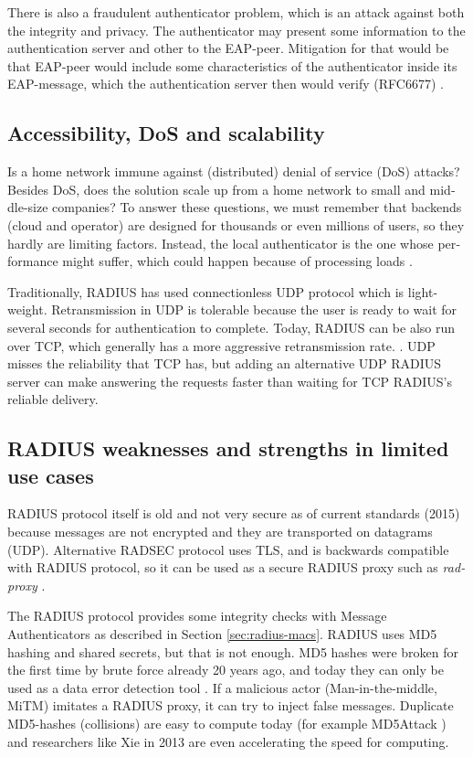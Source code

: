 \documentclass[12pt,a4paper,english]{tutthesis}
\begin{document}
\begin{otherlanguage}{english}
There is also a fraudulent authenticator problem, which is an attack
against both the integrity and privacy.  The authenticator may present
some information to the authentication server and other to the
EAP-peer. Mitigation for that would be that EAP-peer would include some
characteristics of the authenticator inside its EAP-message, which
the authentication server then would verify (RFC6677) \cite{rfc6677}.

\subsection{Accessibility, DoS and scalability}
\label{sec-6-1-3}

Is a home network immune against (distributed) denial of service (DoS)
attacks? Besides DoS, does the solution scale up from a home network to
small and middle-size companies?
To answer these questions, we must remember that backends (cloud and operator) are
designed for thousands or even millions of users, so 
they hardly are limiting factors. Instead, the local
authenticator is the one whose performance might suffer, which
could happen because of processing loads \cite{2009-lin-simefficiency}.


Traditionally, RADIUS has used connection\-less UDP protocol which  is
light-weight. Retransmission in UDP is tolerable because the user is
ready to wait for several seconds for authentication to complete.  
Today, RADIUS can be also run over TCP, which generally has a more
aggressive retransmission rate. \cite[Section 2.2.1]{rfc5080}.
UDP misses the reliability that TCP has, but adding an alternative UDP RADIUS
server can make answering the requests faster than waiting for TCP RADIUS's reliable delivery.


\subsection{RADIUS weaknesses and strengths in limited use cases}
\label{sec-6-1-4}


RADIUS protocol itself is old and not very secure as of current
standards (2015) because messages are not encrypted and they are
transported on datagrams (UDP). Alternative RADSEC protocol uses TLS, and 
is backwards compatible with RADIUS protocol, so it can be used
as a secure RADIUS proxy such as \emph{radproxy} \cite{uninett-radproxy}.

The RADIUS protocol provides some integrity checks with Message
Authenticators as described in Section \ref{sec:radius-macs}.  RADIUS uses
MD5 hashing and shared secrets, but that is not enough.  MD5 hashes
were broken for the first time  by brute force already 20 years ago, and today
they can only be used as a data error detection
tool \cite[p.2]{rfc6151}.  If a malicious actor (Man-in-the-middle,
MiTM) imitates a RADIUS proxy, it can try to inject false messages.
Duplicate MD5-hashes (collisions) are easy to compute today (for 
example MD5Attack \cite{rfc5176}) and researchers like Xie in
2013 \cite{xie2013fast}  are even accelerating the speed for
computing.


\end{otherlanguage}
\end{document}
